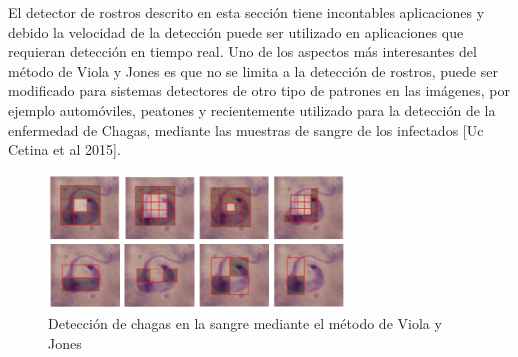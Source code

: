    El detector de rostros descrito en esta sección tiene incontables aplicaciones y debido la velocidad de la detección puede ser utilizado en aplicaciones que requieran detección en tiempo real. Uno de los aspectos más interesantes del método de Viola y Jones es que no se limita a la detección de rostros, puede ser modificado para sistemas detectores de otro tipo de patrones en las imágenes, por ejemplo automóviles, peatones y recientemente utilizado para la detección de la enfermedad de Chagas, mediante las muestras de sangre de los infectados [Uc Cetina et al 2015].
   \begin{figure}[htbp]
   	\centering
   	\includegraphics[width=0.7\textwidth]{./pictures/chagas}
   	\caption{Detección de chagas en la sangre mediante el método de Viola y Jones}\label{fig: figura}
   \end{figure}
   

